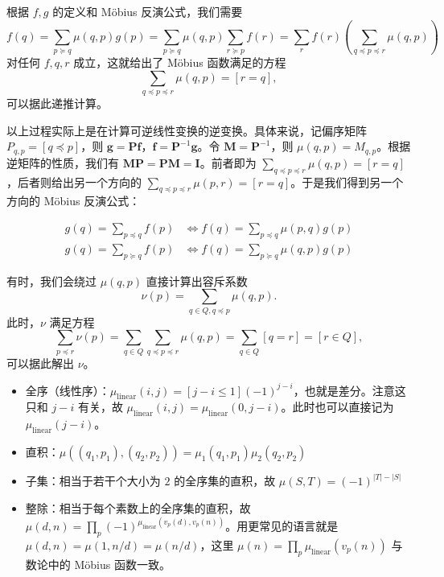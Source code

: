 根据 $f,g$ 的定义和 M{\"o}bius 反演公式，我们需要
$$
f(q)=\sum_{p\succeq q}\mu(q,p)g(p)=\sum_{p\succeq q}\mu(q,p)\sum_{r\succeq p}f(r)=\sum_{r}f(r)\left(\sum_{q\preceq p\preceq r}\mu(q,p)\right)
$$
对任何 $f,q,r$ 成立，这就给出了 M{\"o}bius 函数满足的方程
$$
\sum_{q\preceq p\preceq r}\mu(q,p)=[r=q],
$$
可以据此递推计算。

以上过程实际上是在计算可逆线性变换的逆变换。具体来说，记偏序矩阵 $P_{q,p}=[q\preceq p]$，则 $\mathbf g=\mathbf{Pf}$，$\mathbf f=\mathbf P^{-1}\mathbf g$。令 $\mathbf M=\mathbf P^{-1}$，则 $\mu(q,p)=M_{q,p}$。根据逆矩阵的性质，我们有 $\mathbf{MP}=\mathbf{PM}=\mathbf I$。前者即为 $\sum_{q\preceq p\preceq r}\mu(q,p)=[r=q]$，后者则给出另一个方向的 $\sum_{q\preceq p\preceq r}\mu(p,r)=[r=q]$。于是我们得到另一个方向的 M{\"o}bius 反演公式：
\begin{theorem}[M{\"o}bius 反演]
    $$
    \begin{aligned}
    g(q)=\sum_{p\preceq q}f(p)&\iff f(q)=\sum_{p\preceq q}\mu(p,q)g(p)\\
    g(q)=\sum_{p\succeq q}f(p)&\iff f(q)=\sum_{p\succeq q}\mu(q,p)g(p)
    \end{aligned}
    $$
\end{theorem}

有时，我们会绕过 $\mu(q,p)$ 直接计算出容斥系数
$$
\nu(p)=\sum_{q\in Q,q\preceq p}\mu(q,p).
$$
此时，$\nu$ 满足方程
$$
\sum_{p\preceq r}\nu(p)=\sum_{q\in Q}\sum_{q\preceq p\preceq r}\mu(q,p)=\sum_{q\in Q}[q=r]=[r\in Q],
$$
可以据此解出 $\nu$。


\begin{example}
    \begin{itemize}
        \item 全序（线性序）：$\mu_{\mathrm{linear}}(i,j)=[j-i\le 1](-1)^{j-i}$，也就是差分。注意这只和 $j-i$ 有关，故 $\mu_{\mathrm{linear}}(i,j)=\mu_{\mathrm{linear}}(0,j-i)$。此时也可以直接记为 $\mu_{\mathrm{linear}}(j-i)$。
        \item 直积：$\mu((q_1,p_1),(q_2,p_2))=\mu_1(q_1,p_1)\mu_2(q_2,p_2)$
        \item 子集：相当于若干个大小为 $2$ 的全序集的直积，故 $\mu(S,T)=(-1)^{|T|-|S|}$
        \item 整除：相当于每个素数上的全序集的直积，故 $\mu(d,n)=\prod_{p}(-1)^{\mu_{\mathrm{linear}}(v_p(d),v_p(n))}$。用更常见的语言就是 $\mu(d,n)=\mu(1,n/d)=\mu(n/d)$，这里 $\mu(n)=\prod_{p}\mu_{\mathrm{linear}}(v_p(n))$ 与数论中的 M{\"o}bius 函数一致。
    \end{itemize}
\end{example}

